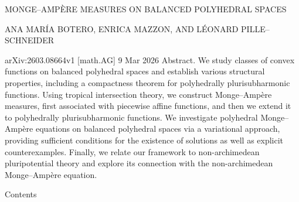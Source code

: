 \documentclass[
  11pt,
]{article}
\newenvironment{Shaded}{}{}
\newcommand{\NormalTok}[1]{#1}
\begin{document}
\begin{Shaded}
\begin{Highlighting}[]
\NormalTok{                                             MONGE–AMPÈRE MEASURES ON BALANCED POLYHEDRAL SPACES}

\NormalTok{                                                       ANA MARÍA BOTERO, ENRICA MAZZON, AND LÉONARD PILLE–SCHNEIDER}




\NormalTok{arXiv:2603.08664v1 [math.AG] 9 Mar 2026}
\NormalTok{                                                  Abstract. We study classes of convex functions on balanced polyhedral spaces and establish}
\NormalTok{                                                  various structural properties, including a compactness theorem for polyhedrally plurisubharmonic}
\NormalTok{                                                  functions. Using tropical intersection theory, we construct Monge–Ampère measures, first}
\NormalTok{                                                  associated with piecewise affine functions, and then we extend it to polyhedrally plurisubharmonic}
\NormalTok{                                                  functions.}
\NormalTok{                                                     We investigate polyhedral Monge–Ampère equations on balanced polyhedral spaces via a}
\NormalTok{                                                  variational approach, providing sufficient conditions for the existence of solutions as well as explicit}
\NormalTok{                                                  counterexamples. Finally, we relate our framework to non{-}archimedean pluripotential theory and}
\NormalTok{                                                  explore its connection with the non{-}archimedean Monge–Ampère equation.}


\NormalTok{                                                                                               Contents}


\end{Highlighting}
\end{Shaded}
\end{document}
